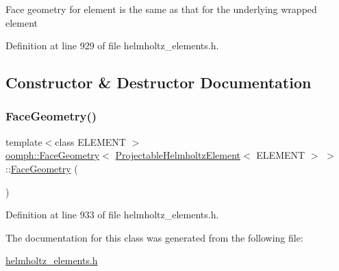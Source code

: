 Face geometry for element is the same as that for the underlying wrapped element 

Definition at line 929 of file helmholtz\+\_\+elements.\+h.



\subsection{Constructor \& Destructor Documentation}
\mbox{\label{classoomph_1_1FaceGeometry_3_01ProjectableHelmholtzElement_3_01ELEMENT_01_4_01_4_a7b2e24560e06a6f1019d73380fd32639}} 
\subsubsection{\texorpdfstring{Face\+Geometry()}{FaceGeometry()}}
{\footnotesize\ttfamily template$<$class E\+L\+E\+M\+E\+NT $>$ \\
\hyperlink{classoomph_1_1FaceGeometry}{oomph\+::\+Face\+Geometry}$<$ \hyperlink{classoomph_1_1ProjectableHelmholtzElement}{Projectable\+Helmholtz\+Element}$<$ E\+L\+E\+M\+E\+NT $>$ $>$\+::\hyperlink{classoomph_1_1FaceGeometry}{Face\+Geometry} (\begin{DoxyParamCaption}{ }\end{DoxyParamCaption})\hspace{0.3cm}{\ttfamily [inline]}}



Definition at line 933 of file helmholtz\+\_\+elements.\+h.



The documentation for this class was generated from the following file\+:\begin{DoxyCompactItemize}
\item 
\hyperlink{helmholtz__elements_8h}{helmholtz\+\_\+elements.\+h}\end{DoxyCompactItemize}
